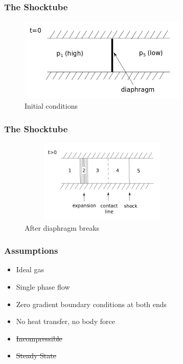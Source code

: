 \documentclass{beamer}
\begin{document}
    \begin{frame}
        \frametitle{The Shocktube}       
            \begin{figure}
                \includegraphics[height = 40mm,width = 80mm]{IC_sod.png}
                \caption{Initial conditions}
            \end{figure}          
    \end{frame}


    \begin{frame}
        \frametitle{The Shocktube}       
            \begin{figure}
                \includegraphics[height = 40mm,width = 80mm]{solution_sod.png}
                \caption{After diaphragm breaks}
            \end{figure}          
    \end{frame}


    \begin{frame}
        \frametitle{Assumptions}
        \begin{itemize}
            \item Ideal gas 
            \item Single phase flow
            \item Zero gradient boundary conditions at both ends
            \item No heat transfer, no body force
            \item \st{Incompressible}
            \item \st{Steady State}        
        \end{itemize}        
    \end{frame}
\end{document}
